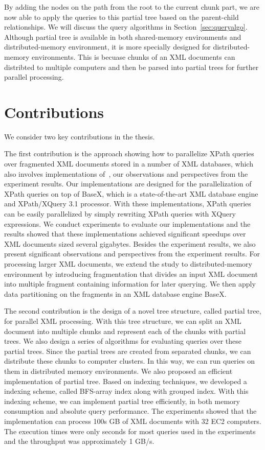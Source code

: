 By adding the nodes on the path from the root to the current chunk part, we are
now able to apply the queries to this partial tree based on the parent-child
relationships. We will discuss the query algorithms in
Section~\ref{sec:queryalgo}. Although partial tree is available in both
shared-memory environments and distributed-memory environment, it is more
specially designed for distributed-memory environments. This is becuase chunks
of an XML documents can distribted to multiple computers and then be parsed into
partial trees for further parallel processing.

\section{Contributions}

We consider two key contributions in the thesis.

The first contribution is the approach showing how to parallelize XPath queries
over fragmented XML documents stored in a number of XML databases, which also
involves implementations of~\cite{BoLS09}, our observations and perspectives
from the experiment results. Our implementations are designed for the
parallelization of XPath queries on top of BaseX, which is a state-of-the-art
XML database engine and XPath/XQuery 3.1 processor. With these implementations,
XPath queries can be easily parallelized by simply rewriting XPath queries with
XQuery expressions. We conduct experiments to evaluate our implementations and
the results showed that these implementations achieved significant speedups over
XML documents sized several gigabytes. Besides the experiment results, we also
present significant observations and perspectives from the experiment results.
For processing larger XML documents, we extend the study to distributed-memory
environment by introducing fragmentation that divides an input XML document 
into multiple fragment containing information for later querying. We then apply
data partitioning on the fragments in an XML database engine BaseX. 

The second contribution is the design of a novel tree structure, called partial
tree, for parallel XML processing. With this tree structure, we can split an XML
document into multiple chunks and represent each of the chunks with partial
trees. We also design a series of algorithms for evaluating queries over these
partial trees. Since the partial trees are created from separated chunks, we can
distribute these chunks to computer clusters. In this way, we can run queries on
them in distributed memory environments. We also proposed an efficient
implementation of partial tree. Based on indexing techniques, we developed a
indexing scheme, called BFS-array index along with grouped index. With this
indexing scheme, we can implement partial tree efficiently, in both memory
consumption and absolute query performance. The experiments showed that the
implementation can process 100s GB of XML documents with 32 EC2 computers. The
execution times were only seconds for most queries used in the experiments and
the throughput was approximately 1 GB/s.

